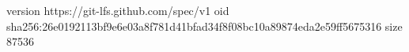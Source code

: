 version https://git-lfs.github.com/spec/v1
oid sha256:26e0192113bf9e6e03a8f781d41bfad34f8f08bc10a89874eda2e59ff5675316
size 87536
